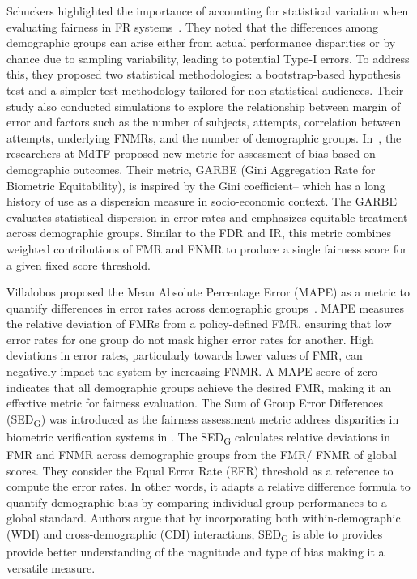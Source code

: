 Schuckers \etal highlighted the importance of accounting for statistical
variation when evaluating fairness in FR
systems~\cite{schuckers2022statistical}. They noted that the differences among
demographic groups can arise either from actual performance disparities or by
chance due to sampling variability, leading to potential Type-I errors. To
address this, they proposed two statistical methodologies: a bootstrap-based
hypothesis test and a simpler test methodology tailored for non-statistical
audiences. Their study also conducted simulations to explore the relationship
between margin of error and factors such as the number of subjects, attempts,
correlation between attempts, underlying FNMRs, and the number of demographic
groups.
%
In~\cite{howard2022evaluating}, the researchers at MdTF proposed new metric for
assessment of bias based on demographic outcomes. Their metric, GARBE (Gini
Aggregation Rate for Biometric Equitability), is inspired by the Gini
coefficient-- which has a long history of use as a dispersion measure in
socio-economic context. The GARBE evaluates statistical dispersion in error
rates and emphasizes equitable treatment across demographic groups. Similar to
the FDR and IR, this metric combines weighted contributions of FMR and FNMR to
produce a single fairness score for a given fixed score threshold.

Villalobos \etal proposed the Mean Absolute Percentage Error (MAPE) as a metric
to quantify differences in error rates across demographic
groups~\cite{villalobos2022fair}. MAPE measures the relative deviation of FMRs
from a policy-defined FMR, ensuring that low error rates for one group do not
mask higher error rates for another. High deviations in error rates,
particularly towards lower values of FMR, can negatively impact the system by
increasing FNMR. A MAPE score of zero indicates that all demographic groups
achieve the desired FMR, making it an effective metric for fairness evaluation.
%
The Sum of Group Error Differences (SED\textsubscript{G}) was introduced as the
fairness assessment metric address disparities in biometric verification systems
in \cite{elobaid2024sum}. The SED\textsubscript{G} calculates relative
deviations in FMR and FNMR across demographic groups from the FMR/ FNMR of
global scores. They consider the Equal Error Rate (EER) threshold as a reference
to compute the error rates. In other words, it adapts a relative difference
formula to quantify demographic bias by comparing individual group performances
to a global standard. Authors argue that by incorporating both
within-demographic (WDI) and cross-demographic (CDI) interactions,
SED\textsubscript{G} is able to provides provide better understanding of the
magnitude and type of bias making it a versatile measure.


